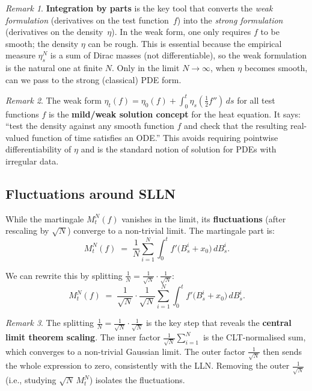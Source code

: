 \documentclass[11pt]{article}
\theoremstyle{definition}
\theoremstyle{remark}
\newtheorem{remark}{Remark}
\begin{document}
\begin{remark}
\textbf{Integration by parts} is the key tool that converts the
\emph{weak formulation} (derivatives on the test function~$f$) into
the \emph{strong formulation} (derivatives on the density~$\eta$).
In the weak form, one only requires $f$ to be smooth; the density
$\eta$ can be rough.  This is essential because the empirical
measure $\eta_s^N$ is a sum of Dirac masses (not differentiable),
so the weak formulation is the natural one at finite $N$.  Only
in the limit $N \to \infty$, when $\eta$ becomes smooth, can we
pass to the strong (classical) PDE form.
\end{remark}

\begin{remark}
The weak form $\eta_t(f) = \eta_0(f) + \int_0^t
\eta_s(\tfrac{1}{2}f'')\,ds$ for all test functions $f$ is
the \textbf{mild/weak solution concept} for the heat equation.
It says: ``test the density against any smooth function $f$ and
check that the resulting real-valued function of time satisfies
an ODE.''  This avoids requiring pointwise differentiability of
$\eta$ and is the standard notion of solution for PDEs with
irregular data.
\end{remark}

\subsection*{Fluctuations around SLLN}


While the martingale $M_t^N(f)$ vanishes in the limit,
its \textbf{fluctuations} (after rescaling by $\sqrt{N}$)
converge to a non-trivial limit.
The martingale part is:
\[
    M_t^N(f)
    \;=\;
    \frac{1}{N}\sum_{i=1}^{N}
    \int_0^t f'\!\bigl(B_s^i + x_0\bigr)\,dB_s^i.
\]

We can rewrite this by splitting $\frac{1}{N} = \frac{1}{\sqrt{N}} \cdot \frac{1}{\sqrt{N}}$:
\[
    M_t^N(f)
    \;=\;
    \frac{1}{\sqrt{N}}
    \cdot
    \frac{1}{\sqrt{N}}\sum_{i=1}^{N}
    \int_0^t f'\!\bigl(B_s^i + x_0\bigr)\,dB_s^i.
\]

\begin{remark}
The splitting $\frac{1}{N} = \frac{1}{\sqrt{N}} \cdot \frac{1}{\sqrt{N}}$ is the key step that reveals the \textbf{central limit theorem scaling}.  The inner factor $\frac{1}{\sqrt{N}}\sum_{i=1}^N$ is the CLT-normalised sum, which converges to a non-trivial Gaussian limit.  The outer factor $\frac{1}{\sqrt{N}}$ then sends the whole expression to zero, consistently with the LLN.  Removing the outer $\frac{1}{\sqrt{N}}$ (i.e., studying $\sqrt{N}\,M_t^N$) isolates the fluctuations.
\end{remark}
\end{document}
